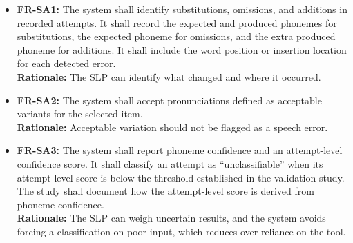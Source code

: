 \documentclass[12pt]{article}
\begin{document}
\begin{itemize}
\item \textbf{FR-SA1:} The system shall identify substitutions, omissions, and additions in recorded attempts. It shall record the expected and produced phonemes for substitutions, the expected phoneme for omissions, and the extra produced phoneme for additions. It shall include the word position or insertion location for each detected error. \\\textbf{Rationale:} The SLP can identify what changed and where it occurred.
\item \textbf{FR-SA2:} The system shall accept pronunciations defined as acceptable variants for the selected item. \\\textbf{Rationale:} Acceptable variation should not be flagged as a speech error.
\item \textbf{FR-SA3:} The system shall report phoneme confidence and an attempt-level confidence score. It shall classify an attempt as ``unclassifiable'' when its attempt-level score is below the threshold established in the validation study. The study shall document how the attempt-level score is derived from phoneme confidence. \\\textbf{Rationale:} The SLP can weigh uncertain results, and the system avoids forcing a classification on poor input, which reduces over-reliance on the tool.
\end{itemize}
\end{document}
